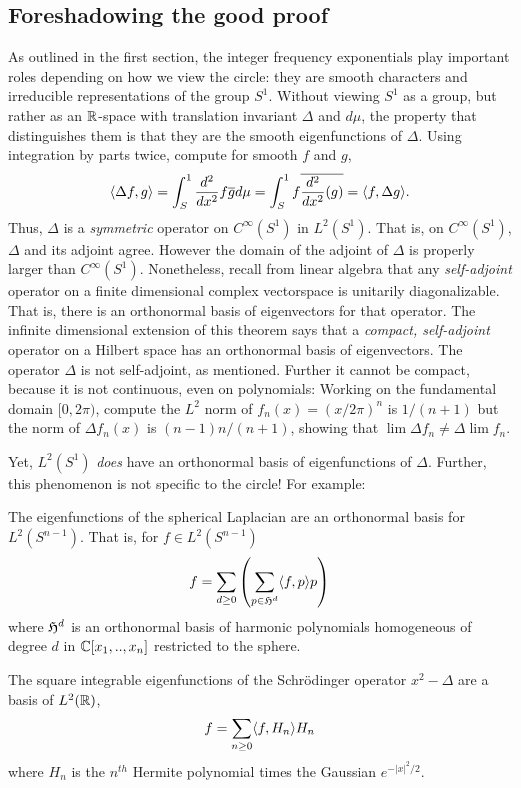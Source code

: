 \documentclass[12pt]{amsart}
\newcommand{\der}{\frac{d^2}{dx^2}}
\begin{document}
\subsection{Foreshadowing the good proof}
	As outlined in the first section, the integer frequency exponentials play important roles depending on how we view the circle: they are smooth characters and irreducible representations of the group $S^1$. Without viewing $S^1$ as a group, but rather as an $\mathbb{R}$-space with translation invariant $\Delta$ and $d\mu$, the property that distinguishes them is that they are the smooth eigenfunctions of $\Delta$. Using integration by parts twice, compute for smooth $f$ and $g$,
	\begin{equation*}
		\ip{\Delta f}{g}=\int_S^1 \der f \overline{g} d\mu = \int_S^1 f \overline{\der(g)} = \ip{f}{\Delta g}.
	\end{equation*}
Thus, $\Delta$ is a \emph{symmetric} operator on $C^\infty(S^1)$ in $L^2(S^1)$. That is, on $C^\infty(S^1)$, $\Delta$ and its adjoint agree. However the domain of the adjoint of $\Delta$ is properly larger than $C^\infty(S^1)$. Nonetheless, recall from linear algebra that any \emph{self-adjoint} operator on a finite dimensional complex vectorspace is unitarily diagonalizable. That is, there is an orthonormal basis of eigenvectors for that operator. The infinite dimensional extension of this theorem says that a \emph{compact, self-adjoint} operator on a Hilbert space has an orthonormal basis of eigenvectors. The operator $\Delta$ is not self-adjoint, as mentioned. Further it cannot be compact, because it is not continuous, even on polynomials: Working on the fundamental domain $[0,2\pi)$, compute the $L^2$ norm of $f_n(x)=(x/2\pi)^n$ is $1/(n+1)$ but the norm of $\Delta f_n(x)$ is $(n-1)n/(n+1)$, showing that $\lim \Delta f_n \neq \Delta \lim f_n$.

Yet, $L^2(S^1)$ \emph{does} have an orthonormal basis of eigenfunctions of $\Delta$. Further, this phenomenon is not specific to the circle!  For example: 

The eigenfunctions of the spherical Laplacian are an orthonormal basis for  $L^2(S^{n-1})$. That is, for $f\in L^2(S^{n-1})$
	\begin{align*}
		f=\sum_{d\geq 0}\left( \sum_{p \in \mathfrak{H}^{d}} \langle f, p \rangle p \right) 
	\end{align*}
where $\mathfrak{H}^d$ is an orthonormal basis of harmonic polynomials homogeneous of degree $d$ in $\mathbb{C}[x_1,..,x_n]$ restricted to the sphere. 


The square integrable eigenfunctions of the Schr\"odinger operator $x^2-\Delta$ are a basis of $L^2(\mathbb{R})$,
	\begin{align*}
		f=\sum_{n \geq 0} \langle f, H_{n} \rangle H_{n} 
	\end{align*}
where $H_n$ is the $n^{th}$ Hermite polynomial times the Gaussian $e^{-|x|^2/2}$. 
\end{document}
